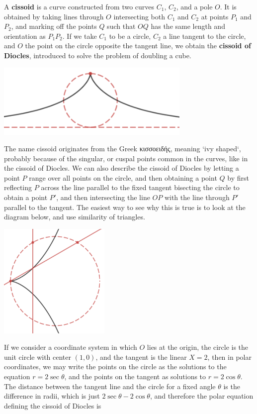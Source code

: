 \begin{example}
    A {\bf cissoid} is a curve constructed from two curves $C_1$, $C_2$, and a pole $O$. It is obtained by taking lines through $O$ intersecting both $C_1$ and $C_2$ at points $P_1$ and $P_2$, and marking off the points $Q$ such that $OQ$ has the same length and orientation as $P_1P_2$. If we take $C_1$ to be a circle, $C_2$ a line tangent to the circle, and $O$ the point on the circle opposite the tangent line, we obtain the {\bf cissoid of Diocles}, introduced to solve the problem of doubling a cube.
    \begin{center}
    \includegraphics[width=0.7\textwidth]{algebraicGeometryCissoidDiocles}
    \end{center}
    The name cissoid originates from the Greek \textgreek{κισσοειδής}, meaning `ivy shaped`, probably because of the singular, or cuspal points common in the curves, like in the cissoid of Diocles. We can also describe the cissoid of Diocles by letting a point $P$ range over all points on the circle, and then obtaining a point $Q$ by first reflecting $P$ across the line parallel to the fixed tangent bisecting the circle to obtain a point $P'$, and then intersecting the line $OP$ with the line through $P'$ parallel to the tangent. The easiest way to see why this is true is to look at the diagram below, and use similarity of triangles.
    \begin{center}
        \includegraphics[width=0.4\textwidth]{algebraicGeometryCissoidDiocles2}
    \end{center}
    If we consider a coordinate system in which $O$ lies at the origin, the circle is the unit circle with center $(1,0)$, and the tangent is the linear $X = 2$, then in polar coordinates, we may write the points on the circle as the solutions to the equation $r = 2 \sec \theta$, and the points on the tangent as solutions to $r = 2 \cos \theta$. The distance between the tangent line and the circle for a fixed angle $\theta$ is the difference in radii, which is just $2 \sec \theta - 2 \cos \theta$, and therefore the polar equation defining the cissoid of Diocles is

\end{example}

